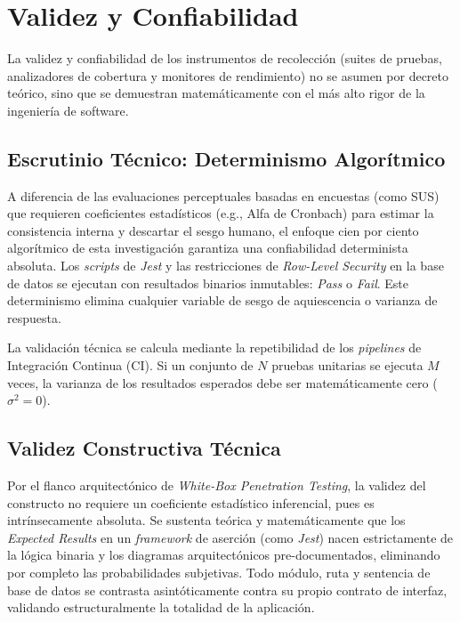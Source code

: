 \section{Validez y Confiabilidad}

La validez y confiabilidad de los instrumentos de recolecci\'on (suites de pruebas, analizadores de cobertura y monitores de rendimiento) no se asumen por decreto te\'orico, sino que se demuestran matem\'aticamente con el m\'as alto rigor de la ingenier\'ia de software.

\subsection{Escrutinio T\'ecnico: Determinismo Algor\'itmico}

A diferencia de las evaluaciones perceptuales basadas en encuestas (como SUS) que requieren coeficientes estad\'isticos (e.g., Alfa de Cronbach) para estimar la consistencia interna y descartar el sesgo humano, el enfoque cien por ciento algor\'itmico de esta investigaci\'on garantiza una confiabilidad determinista absoluta. Los \textit{scripts} de \textit{Jest} y las restricciones de \textit{Row-Level Security} en la base de datos se ejecutan con resultados binarios inmutables: \textit{Pass} o \textit{Fail}. Este determinismo elimina cualquier variable de sesgo de aquiescencia o varianza de respuesta.

La validaci\'on t\'ecnica se calcula mediante la repetibilidad de los \textit{pipelines} de Integraci\'on Continua (CI). Si un conjunto de $N$ pruebas unitarias se ejecuta $M$ veces, la varianza de los resultados esperados debe ser matem\'aticamente cero ($\sigma^2 = 0$).

\subsection{Validez Constructiva T\'ecnica}

Por el flanco arquitect\'onico de \textit{White-Box Penetration Testing}, la validez del constructo no requiere un coeficiente estad\'istico inferencial, pues es intr\'insecamente absoluta. Se sustenta te\'orica y matem\'aticamente que los \textit{Expected Results} en un \textit{framework} de aserci\'on (como \textit{Jest}) nacen estrictamente de la l\'ogica binaria y los diagramas arquitect\'onicos pre-documentados, eliminando por completo las probabilidades subjetivas. Todo m\'odulo, ruta y sentencia de base de datos se contrasta asint\'oticamente contra su propio contrato de interfaz, validando estructuralmente la totalidad de la aplicaci\'on.
